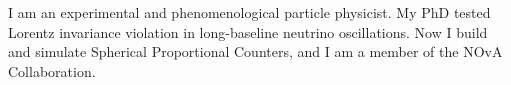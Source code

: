 I am an experimental and phenomenological particle physicist. My PhD tested
Lorentz invariance violation in long-baseline neutrino oscillations. Now I
build and simulate Spherical Proportional Counters, and I am a member of the
NOvA Collaboration.
